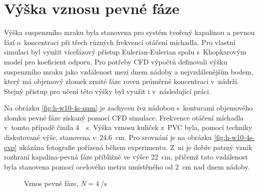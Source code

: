 \section{Výška vznosu pevné fáze}
Výška suspenzního mraku byla stanovena pro systém tvořený kapalinou \pvpS{} a pevnou fází o~koncentraci  při třech různých frekvencí otáčení míchadla. Pro vlastní simulaci byl využit vícefázový přístup Eulerian-Eulerian spolu s~Khopkarovým model pro koeficient odporu. Pro potřeby CFD výpočtů \citet{kas08} definovali výšku suspenzního mraku jako vzdálenost mezi dnem nádoby a nejvzdálenějším bodem, který má objemový zlomek zrnité fáze roven průměrné koncentraci v~nádrži. Stejný přistup pro učení této výšky byl využit i v~následující práci.  

Na obrázku \ref{fig:h-w10-4s-num} je zachycen řez nádobou s~konturami objemového zlomku pevné fáze získaný pomocí CFD simulace. Frekvence otáčení míchadla v~tomto případě činila \SI{4}{\per\second}. Výška vznosu kuliček z~PVC byla, pomocí techniky diskutované výše, stanovena v~\SI{24.6}{\centi\meter}. Pro srovnání je na obrázku \ref{fig:h-w10-4s-exp} ukázána fotografie pořízená během experimentu. Z~ni je dobře patrný vznik rozhraní kapalina-pevná fáze přibližně ve výšce \SI{22}{\centi\meter}, přičemž tato vzdálenost byla stanovena pomocí ocelového metru umístěného od \SI{2}{\centi\meter} nad dnem nádoby.

\begin{figure}[h!]
 \centering
  \qquad 
  \caption{Vznos pevné fáze, $N=\SI{4}{\per\second}$}
  \label{fig:h-w10-4s}
\end{figure}

